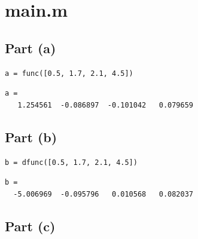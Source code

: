 \documentclass[10pt]{article}
\begin{document}
{\Huge\section*{main.m}}

\tableofcontents
\vspace*{4em}



{}
\subsection*{Part (a)}

\begin{lstlisting}
a = func([0.5, 1.7, 2.1, 4.5])
\end{lstlisting}
\begin{lstlisting}[language={},xleftmargin=5pt,frame=none]
a =
   1.254561  -0.086897  -0.101042   0.079659

\end{lstlisting}


{}
\subsection*{Part (b)}

\begin{lstlisting}
b = dfunc([0.5, 1.7, 2.1, 4.5])
\end{lstlisting}
\begin{lstlisting}[language={},xleftmargin=5pt,frame=none]
b =
  -5.006969  -0.095796   0.010568   0.082037

\end{lstlisting}


{}
\subsection*{Part (c)}
\end{document}
